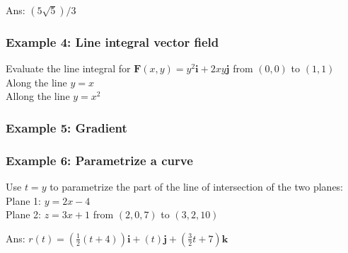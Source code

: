 Ans: $(5\sqrt{5})/3$
\subsubsection{Example 4: Line integral vector field}
Evaluate the line integral for $\mathbf{F}(x,y)=y^2\mathbf{i}+2xy\mathbf{j}$ from $(0,0)$ to $(1,1)$\\
Along the line $y=x$\\
Allong the line $y=x^2$

\subsubsection{Example 5: Gradient}

\subsubsection{Example 6: Parametrize a curve}
Use $t=y$ to parametrize the part of the line of intersection of the two planes:\\
Plane 1: $y=2x-4$\\
Plane 2: $z=3x+1$ from $(2,0,7)$ to $(3,2,10)$

Ans: $r(t)=\left(\frac{1}{2}(t+4)\right)\mathbf{i}+(t)\mathbf{j}+\left(\frac{3}{2}t+7\right)\mathbf{k}$
